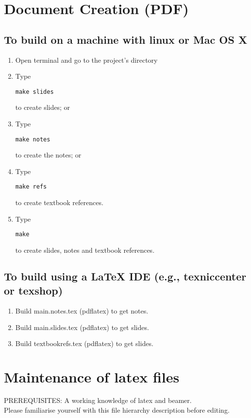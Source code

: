 \documentclass{article}
\begin{document}
\section{Document Creation (PDF)}
\subsection{To build on a machine with linux or Mac OS X}
\begin{enumerate}
\item Open terminal and go to the project's directory
\item Type \begin{verbatim}make slides\end{verbatim} to create slides; or
\item Type \begin{verbatim}make notes\end{verbatim} to create the notes; or
\item Type \begin{verbatim}make refs\end{verbatim} to create textbook references.
\item Type \begin{verbatim}make\end{verbatim} to create slides, notes and textbook references.
\end{enumerate}

\subsection{To build using a LaTeX IDE (e.g., texniccenter or texshop)}
\begin{enumerate}
\item Build main.notes.tex (pdflatex) to get notes.
\item Build main.slides.tex (pdflatex) to get slides.
\item Build textbookrefs.tex (pdflatex) to get slides.
\end{enumerate}

\section{Maintenance of latex files}
PREREQUISITES: A working knowledge of latex and beamer.\\

Please familiarise yourself with this file hierarchy description before editing.\\
\end{document}

